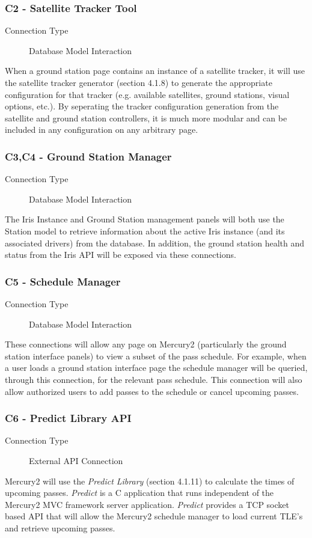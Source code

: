\documentclass{mxl-note}
\begin{document}
\subsubsection{C2 - Satellite Tracker Tool}
\begin{description}
	\item [Connection Type] Database Model Interaction
\end{description}
When a ground station page contains an instance of a satellite tracker, it will use the satellite tracker generator (section 4.1.8) to generate the appropriate configuration for that tracker (e.g. available satellites, ground stations, visual options, etc.). By seperating the tracker configuration generation from the satellite and ground station controllers, it is much more modular and can be included in any configuration on any arbitrary page.

\subsubsection{C3,C4 - Ground Station Manager}
\begin{description}
	\item [Connection Type] Database Model Interaction
\end{description}
The Iris Instance and Ground Station management panels will both use the Station model to retrieve information about the active Iris instance (and its associated drivers) from the database. In addition, the ground station health and status from the Iris API will be exposed via these connections.

\subsubsection{C5 - Schedule Manager}
\begin{description}
	\item [Connection Type] Database Model Interaction
\end{description}
These connections will allow any page on Mercury2 (particularly the ground station interface panels) to view a subset of the pass schedule. For example, when a user loads a ground station interface page the schedule manager will be queried, through this connection, for the relevant pass schedule. This connection will also allow authorized users to add passes to the schedule or cancel upcoming passes.

\subsubsection{C6 - Predict Library API}
\begin{description}
	\item [Connection Type] External API Connection
\end{description}
Mercury2 will use the \textit{Predict Library} (section 4.1.11) to calculate the times of upcoming passes. \textit{Predict} is a C application that runs independent of the Mercury2 MVC framework server application. \textit{Predict} provides a TCP socket based API that will allow the Mercury2 schedule manager to load current TLE's and retrieve upcoming passes.
\end{document}
